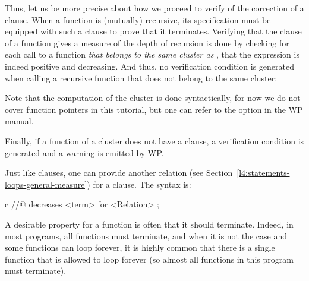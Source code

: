 Thus, let us be more precise about how we proceed to verify of the
correction of a  clause. When a function is (mutually)
recursive, its specification must be equipped with such a clause to prove that
it terminates. Verifying that the  clause of a function
 gives a measure of the depth of recursion is done by checking for
each call to a function \emph{that belongs to the same cluster as
}, that the expression is indeed positive and decreasing. And
thus, no verification condition is generated when calling a recursive function
that does not belong to the same cluster:




\begin{Information}
  Note that the computation of the cluster is done syntactically, for now we do
  not cover function pointers in this tutorial, but one can refer to the option
   in the WP manual.
\end{Information}


Finally, if a function of a cluster does not have a 
clause, a  verification condition is generated
and a warning is emitted by WP.






\begin{Information}
  Just like  clauses, one can provide another relation
  (see Section~\ref{l4:statements-loops-general-measure}) for a
   clause. The syntax is:


  \begin{CodeBlock}{c}
//@ decreases <term> for <Relation> ;
\end{CodeBlock}
\end{Information}


\label{l3:statements-function-calls-terminates}


A desirable property for a function is often that it should terminate. Indeed,
in most programs, all functions must terminate, and when it is not the case and
some functions can loop forever, it is highly common that there is a single
function that is allowed to loop forever (so almost all functions in this
program must terminate).




